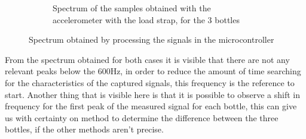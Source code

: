 \begin{figure}[]
\begin{subfigure}{0.45\textwidth}
        \caption{Spectrum of the samples obtained with the accelerometer with the load strap, for the 3 bottles}{}
        \label{subfig:specAccuC}
    \end{subfigure}
    \caption{Spectrum obtained by processing the signals in the microcontroller}{}
    \label{fig:specuC}
\end{figure}

From the spectrum obtained for both cases it is visible that there are not any relevant peaks below the 600Hz, in order to reduce the amount of time searching for the characteristics of the captured signals, this frequency is the reference to start. Another thing that is visible here is that it is possible to observe a shift in frequency for the first peak of the measured signal for each bottle, this can give us with certainty on method to determine the difference between the three bottles, if the other methods aren't precise.

